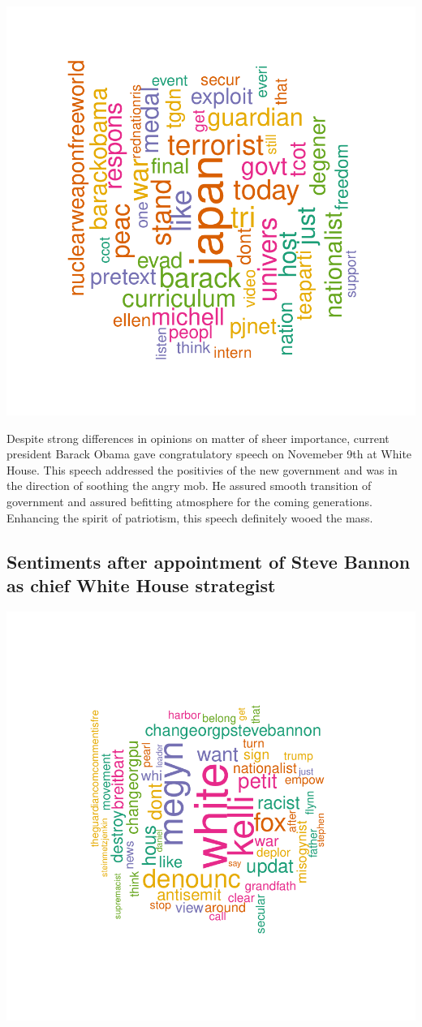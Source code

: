 \documentclass[a4paper,12pt]{book}
\theoremstyle{break}
\begin{document}
\includegraphics{finnn-r7}

Despite strong differences in opinions on matter of sheer importance, current president Barack Obama gave congratulatory speech on Novemeber 9th at White House. This speech addressed the positivies of the new government and was in the direction of soothing the angry mob. He assured smooth transition of government and assured befitting atmosphere for the coming generations. Enhancing the spirit of patriotism, this speech definitely wooed the mass.

\subsection{Sentiments after appointment of Steve Bannon as chief White House strategist}

\includegraphics{finnn-r8}
\end{document}
